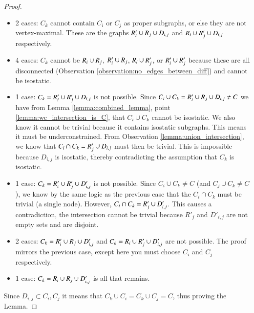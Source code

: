 \begin{proof}
\begin{itemize}
    \item 2 cases: $C_k$ cannot contain $C_i$ or $C_j$ as proper subgraphs, or else they are not vertex-maximal. These are the graphs $R'_i\cup R_j\cup D_{i,j}$ and $R_i\cup R'_j\cup D_{i,j}$ respectively.

    \item 4 cases: \usestwod $C_k$ cannot be $R_i\cup R_j$, $R'_i\cup R_j$, $R_i\cup R'_j$, or $R'_i\cup R'_j$ because these are all disconnected (Observation \ref{observation:no_edges_between_diff}) and cannot be isostatic.

    \item 1 case: $C_k=R'_i\cup R'_j\cup D_{i,j}$ is not possible. Since $C_i\cup C_k = R'_i\cup R_j\cup D_{i,j}\neq C$ we have from Lemma \ref{lemma:combined_lemma}, point \ref{lemma:wc_intersection_is_C}, that $C_i\cup C_k$ cannot be isostatic. We also know it cannot be trivial because it contains isostatic subgraphs. This means it must be underconstrained. From Observation \ref{lemma:union_intersection}, we know that $C_i\cap C_k=R'_j\cup D_{i,j}$ must then be trivial. This is impossible because $D_{i,j}$ is isostatic, thereby contradicting the assumption that $C_k$ is isostatic.

    \item 1 case: \usestwod $C_k=R'_i\cup R'_j\cup D'_{i,j}$ is not possible. Since $C_i\cup C_k\neq C$ (and $C_j\cup C_k\neq C$), we know by the same logic as the previous case that the $C_i\cap C_k$ must be trivial (a single node). However, $C_i\cap C_k=R'_j\cup D'_{i,j}$. This causes a contradiction, the intersection cannot be trivial because $R'_j$ and $D'_{i,j}$ are not empty sets and are disjoint.

    \item 2 cases: \usestwod $C_k=R'_i\cup R_j\cup D'_{i,j}$ and $C_k=R_i\cup R'_j\cup D'_{i,j}$ are not possible. The proof mirrors the previous case, except here you must choose $C_i$ and $C_j$ respectively.

    \item 1 case: $C_k=R_i\cup R_j\cup D'_{i,j}$ is all that remains.
\end{itemize}

Since $D_{i,j}\subset C_i, C_j$ it means that $C_k\cup C_i = C_k \cup C_j = C$, thus proving the Lemma.
%
\end{proof}

